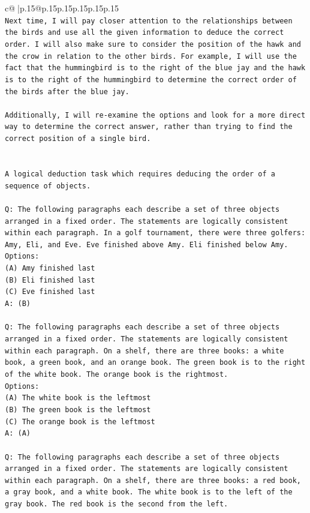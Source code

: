 \documentclass{article}
\begin{document}
{\begin{supertabular}{c@{$\;$}|p{.15\linewidth}@{}p{.15\linewidth}p{.15\linewidth}p{.15\linewidth}p{.15\linewidth}p{.15\linewidth}}
{{{\\ 
\texttt{Next time, I will pay closer attention to the relationships between the birds and use all the given information to deduce the correct order. I will also make sure to consider the position of the hawk and the crow in relation to the other birds. For example, I will use the fact that the hummingbird is to the right of the blue jay and the hawk is to the right of the hummingbird to determine the correct order of the birds after the blue jay.} \\
\\ 
\texttt{Additionally, I will re{-}examine the options and look for a more direct way to determine the correct answer, rather than trying to find the correct position of a single bird.} \\
\\ 
\\ 
\texttt{A logical deduction task which requires deducing the order of a sequence of objects.} \\
\\ 
\texttt{Q: The following paragraphs each describe a set of three objects arranged in a fixed order. The statements are logically consistent within each paragraph. In a golf tournament, there were three golfers: Amy, Eli, and Eve. Eve finished above Amy. Eli finished below Amy.} \\
\texttt{Options:} \\
\texttt{(A) Amy finished last} \\
\texttt{(B) Eli finished last} \\
\texttt{(C) Eve finished last} \\
\texttt{A: (B)} \\
\\ 
\texttt{Q: The following paragraphs each describe a set of three objects arranged in a fixed order. The statements are logically consistent within each paragraph. On a shelf, there are three books: a white book, a green book, and an orange book. The green book is to the right of the white book. The orange book is the rightmost.} \\
\texttt{Options:} \\
\texttt{(A) The white book is the leftmost} \\
\texttt{(B) The green book is the leftmost} \\
\texttt{(C) The orange book is the leftmost} \\
\texttt{A: (A)} \\
\\ 
\texttt{Q: The following paragraphs each describe a set of three objects arranged in a fixed order. The statements are logically consistent within each paragraph. On a shelf, there are three books: a red book, a gray book, and a white book. The white book is to the left of the gray book. The red book is the second from the left.} \\
}}}
\end{supertabular}}
\end{document}
